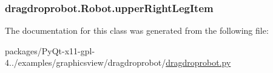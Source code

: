 \subsubsection[{upper\+Right\+Leg\+Item}]{\setlength{\rightskip}{0pt plus 5cm}dragdroprobot.\+Robot.\+upper\+Right\+Leg\+Item}\label{classdragdroprobot_1_1Robot_aa0109934e8ba90cab6d5059bf5ded713}


The documentation for this class was generated from the following file\+:\begin{DoxyCompactItemize}
\item 
packages/\+Py\+Qt-\/x11-\/gpl-\/4../examples/graphicsview/dragdroprobot/\hyperlink{dragdroprobot_8py}{dragdroprobot.\+py}\end{DoxyCompactItemize}
